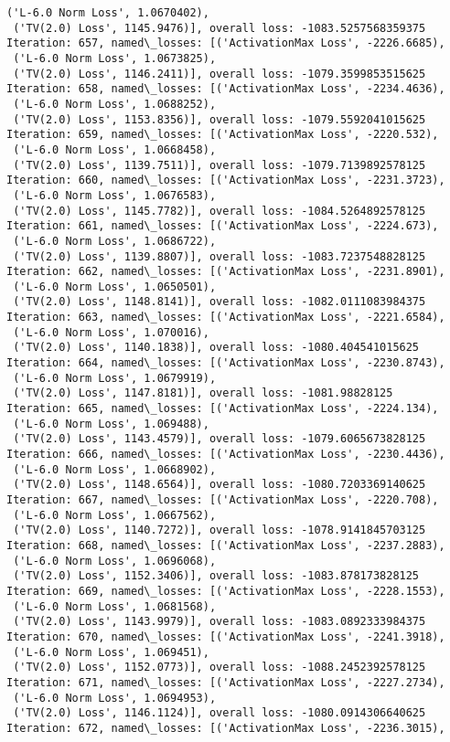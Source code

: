\documentclass[10pt]{article}
\begin{document}
\begin{Verbatim}[commandchars=\\\{\}]
 ('L-6.0 Norm Loss', 1.0670402),
 ('TV(2.0) Loss', 1145.9476)], overall loss: -1083.5257568359375
Iteration: 657, named\_losses: [('ActivationMax Loss', -2226.6685),
 ('L-6.0 Norm Loss', 1.0673825),
 ('TV(2.0) Loss', 1146.2411)], overall loss: -1079.3599853515625
Iteration: 658, named\_losses: [('ActivationMax Loss', -2234.4636),
 ('L-6.0 Norm Loss', 1.0688252),
 ('TV(2.0) Loss', 1153.8356)], overall loss: -1079.5592041015625
Iteration: 659, named\_losses: [('ActivationMax Loss', -2220.532),
 ('L-6.0 Norm Loss', 1.0668458),
 ('TV(2.0) Loss', 1139.7511)], overall loss: -1079.7139892578125
Iteration: 660, named\_losses: [('ActivationMax Loss', -2231.3723),
 ('L-6.0 Norm Loss', 1.0676583),
 ('TV(2.0) Loss', 1145.7782)], overall loss: -1084.5264892578125
Iteration: 661, named\_losses: [('ActivationMax Loss', -2224.673),
 ('L-6.0 Norm Loss', 1.0686722),
 ('TV(2.0) Loss', 1139.8807)], overall loss: -1083.7237548828125
Iteration: 662, named\_losses: [('ActivationMax Loss', -2231.8901),
 ('L-6.0 Norm Loss', 1.0650501),
 ('TV(2.0) Loss', 1148.8141)], overall loss: -1082.0111083984375
Iteration: 663, named\_losses: [('ActivationMax Loss', -2221.6584),
 ('L-6.0 Norm Loss', 1.070016),
 ('TV(2.0) Loss', 1140.1838)], overall loss: -1080.404541015625
Iteration: 664, named\_losses: [('ActivationMax Loss', -2230.8743),
 ('L-6.0 Norm Loss', 1.0679919),
 ('TV(2.0) Loss', 1147.8181)], overall loss: -1081.98828125
Iteration: 665, named\_losses: [('ActivationMax Loss', -2224.134),
 ('L-6.0 Norm Loss', 1.069488),
 ('TV(2.0) Loss', 1143.4579)], overall loss: -1079.6065673828125
Iteration: 666, named\_losses: [('ActivationMax Loss', -2230.4436),
 ('L-6.0 Norm Loss', 1.0668902),
 ('TV(2.0) Loss', 1148.6564)], overall loss: -1080.7203369140625
Iteration: 667, named\_losses: [('ActivationMax Loss', -2220.708),
 ('L-6.0 Norm Loss', 1.0667562),
 ('TV(2.0) Loss', 1140.7272)], overall loss: -1078.9141845703125
Iteration: 668, named\_losses: [('ActivationMax Loss', -2237.2883),
 ('L-6.0 Norm Loss', 1.0696068),
 ('TV(2.0) Loss', 1152.3406)], overall loss: -1083.878173828125
Iteration: 669, named\_losses: [('ActivationMax Loss', -2228.1553),
 ('L-6.0 Norm Loss', 1.0681568),
 ('TV(2.0) Loss', 1143.9979)], overall loss: -1083.0892333984375
Iteration: 670, named\_losses: [('ActivationMax Loss', -2241.3918),
 ('L-6.0 Norm Loss', 1.069451),
 ('TV(2.0) Loss', 1152.0773)], overall loss: -1088.2452392578125
Iteration: 671, named\_losses: [('ActivationMax Loss', -2227.2734),
 ('L-6.0 Norm Loss', 1.0694953),
 ('TV(2.0) Loss', 1146.1124)], overall loss: -1080.0914306640625
Iteration: 672, named\_losses: [('ActivationMax Loss', -2236.3015),

\end{Verbatim}
\end{document}
